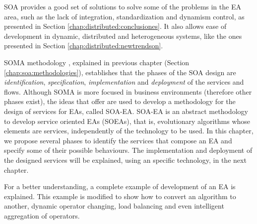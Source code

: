 \label{chap:soaea}
\minitoc\mtcskip
\vfill
\lettrine{S}{OA} provides a good set of solutions to solve some of the
problems in the EA area, such as the lack of integration,
standardization and dynamism control, as presented in Section \ref{chap:distributed:conclusiones}. It also allows ease of
development in dynamic, distributed and heterogeneous systems, like the ones presented in Section \ref{chap:distributed:newtrendson}. %


SOMA methodology \cite{Arsanjani2008SOMA}, explained in previous chapter (Section \ref{chap:soa:methodologies}), establishes that the phases of the SOA design are {\em identification}, {\em specification}, {\em implementation} and {\em deployment} of the services and flows. Although SOMA is more focused in business environments (therefore other phases exist), the ideas that offer are used to develop a methodology for the design of services for EAs, called SOA-EA. SOA-EA is an abstract methodology to develop service oriented EAs (SOEAs), that is, evolutionary algorithms whose elements are services, independently of the technology to be used. In this chapter, we propose several phases to identify the services that compose an EA and specify some of their possible behaviours. The implementation and deployment of the designed services will be explained, using an specific technology, in the next chapter.

For a better understanding, a complete example of development of an EA
is explained. This example is modified to show how to convert an
algorithm to another, dynamic operator changing, load balancing and
even intelligent aggregation of operators. 



